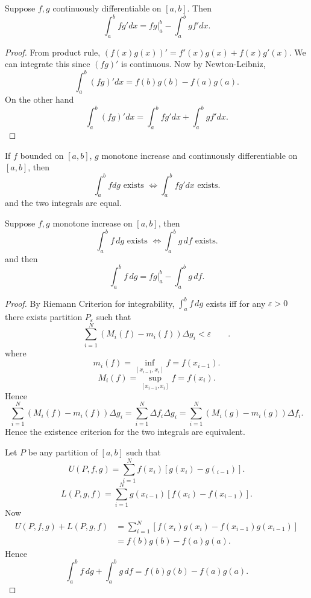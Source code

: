\begin{theorem}
	Suppose $f, g$ continuously differentiable on $[a,b]$. Then 
	\[
		\int_a^b f g' dx = fg|_a^b - \int_a^b g f' dx
	.\] 
\end{theorem}
\begin{proof}
	From product rule, $\left( f(x)g(x) \right) ' = f'(x) g(x) + f(x) g'(x)$. We can integrate this since $(fg)'$ is continuous. Now by Newton-Leibniz, 
	\[
		\int_a^b (fg)' dx = f(b)g(b) - f(a) g(a)
	.\] 
	On the other hand
\[
		\int_a^b (fg)' dx = \int_a^b fg' dx + \int_a^b gf' dx
	.\]
\end{proof}

\begin{theorem}
	If $f$ bounded on $[a,b]$, $g$ monotone increase and continuously differentiable on $[a,b]$, then
	\[
		\int_a^b f dg \text{ exists } \iff  \int_a^b fg' dx \text{ exists}
	.\] 
	and the two integrals are equal.
\end{theorem}

\begin{theorem}
	Suppose $f, g$ monotone increase on $[a,b]$, then
	\[
		\int_a^b f\, dg \text{ exists } \iff  \int _a^b g \,df \text{ exists}
	.\] 
	and then
	\[
		\int_a^b f \,dg = fg|_a^b - \int _a^b g \, df
	.\] 
\end{theorem}
\begin{proof}
	By Riemann Criterion for integrability, $\int_a^b f\, dg$ exists iff for any  $\varepsilon>0$ there exists partition $P_\varepsilon$ such that 
	\[
		\sum_{i=1}^{N} \left( M_i(f) - m_i(f) \right) \Delta g_i < \varepsilon
		\qquad 
	.\] 
	where
\[
		m_i(f) = \operatorname{inf}_{[x_{i-1}, x_i]} f = f(x_{i-1})
	.\]
	\[
		M_i(f) = \operatorname{sup}_{[x_{i-1}, x_i]} f = f(x_i)
	.\] 
	Hence
\[
		\sum_{i=1}^{N} \left( M_i(f) - m_i(f) \right) \Delta g_i 
		= \sum_{i=1}^{N} \Delta f_i \Delta g_i
		=\sum_{i=1}^{N} \left( M_i(g) - m_i(g) \right) \Delta f_i 
	.\]
	Hence the existence criterion for the two integrals are equivalent.

	Let $P$ be any partition of $[a,b]$ such that
	\[
		U(P, f, g)= \sum_{i=1}^{N} f(x_i) [g(x_i) - g(_{i-1})]
	.\] 
	\[
		L(P, g, f) = \sum_{i=1}^{N} g(x_{i-1})\left[ f(x_i) - f(x_{i-1 })\right] 
	.\] 
	Now
	\begin{align*}
		U(P, f, g) + L(P, g, f) &= \sum_{i=1}^{N} \left[ f(x_i) g(x_i) - f(x_{i-1}) g(x_{i-1 }) \right] \\
		&= f(b) g(b) - f(a) g(a)
	.\end{align*} 
	Hence
	\[
		\int_a^b f \,dg + \int _a^b g \, df = 
		f(b) g(b) - f(a) g(a)
	.\] 
\end{proof}


